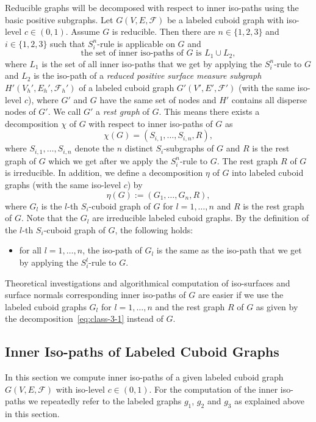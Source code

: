 \documentclass[a4paper,11pt]{article}
\begin{document}
Reducible graphs will be decomposed with respect to inner iso-paths using the basic positive subgraphs.
Let $G(V,E,\mathcal{F})$ be a labeled cuboid graph with iso-level $c\in (0,1)$. Assume $G$ is reducible.
Then there are  $n\in\{1,2,3\}$ and $i\in\{1,2,3\}$ such that $S_i^n$-rule is applicable on $G$ and
\begin{equation}
\mbox{the set of inner iso-paths of }G \mbox{ is } L_1\cup L_2,
\label{eq:class-2}
\end{equation}
where $L_1$ is the set of all inner iso-paths that we get by applying the $S_i^n$-rule to $G$ and $L_2$
is the iso-path of a {\it reduced positive surface measure subgraph} $H'(V_h',E_h',\mathcal{F}_h')$
of a labeled cuboid graph $G'(V',E',\mathcal{F}')$ (with the same iso-level $c$), where $G'$ and $G$
have the same set of nodes and $H'$ contains all disperse nodes of $G'$. We call $G'$ a {\it rest graph}
of $G$. This means there exists a decomposition $\chi$ of $G$ with respect to inner iso-paths of $G$ as
\begin{equation}
\chi(G)=\left(S_{i,1},\ldots,S_{i,n},R\right),
\label{eq:class-3}
\end{equation}
where $S_{i,1},\ldots,S_{i,n}$ denote the $n$ distinct $S_i$-subgraphs of $G$ and $R$
is the rest graph of $G$ which we get after we apply the $S_i^n$-rule to $G$. The rest graph $R$ of $G$
is irreducible. In addition, we define a decomposition $\eta$ of $G$ into labeled cuboid graphs
(with the same iso-level $c$) by
\begin{equation}
\eta(G):=\left(G_1,\ldots,G_n, R\right),
\label{eq:class-3-1}
\end{equation}
where $G_l$ is the $l$-th $S_i$-cuboid graph of $G$ for $l=1,\ldots,n$ and $R$ is the rest graph of $G$.
Note that the $G_l$ are irreducible labeled cuboid graphs. By the definition of the $l$-th
$S_i$-cuboid graph of $G$, the following holds:
\begin{itemize}
\item for all $l=1,\ldots,n$, the iso-path of $G_l$ is the same as the iso-path that we get by
applying the $S_i^l$-rule to $G$.
\end{itemize}
Theoretical investigations and algorithmical computation of iso-surfaces and surface normals corresponding
inner iso-paths of $G$ are easier if we use the labeled cuboid graphs $G_l$ for $l=1,\ldots,n$ and the rest
graph $R$ of $G$ as given by the decomposition~\eqref{eq:class-3-1} instead of $G$.

\subsection{Inner Iso-paths of Labeled Cuboid Graphs}
In this section we compute inner iso-paths of a given labeled cuboid graph $G(V,E,\mathcal{F})$ with iso-level
$c\in (0,1)$. For the computation of the inner iso-paths we repeatedly refer to the labeled graphs $g_1$,
$g_2$ and $g_3$ as explained above in this section.
\end{document}
